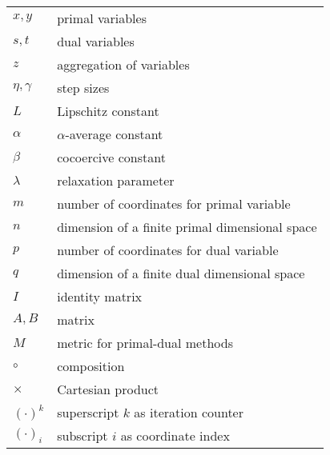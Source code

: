 \begin{table}[htbp]
\begin{tabular}{ll}
  \midrule
  $x, y$ & primal variables \\
  $s, t$ & dual variables \\
  $z$ & aggregation of variables \\ 
  \midrule
  $\eta, \gamma$ & step sizes\\
  $L$ & Lipschitz constant\\
  $\alpha$ & $\alpha$-average constant \\
  $\beta$ & cocoercive constant \\
  $\lambda$ & relaxation parameter \\
  $m$ & number of coordinates for primal variable\\
  $n$ & dimension of a finite primal dimensional space \\
  $p$ & number of coordinates for dual variable\\ 
  $q$ & dimension of a finite dual dimensional space \\
  \midrule
  $I$ & identity matrix \\
  $A, B$ & matrix \\
  $M$ & metric for primal-dual methods \\
  \midrule
  $\circ$ & composition\\
  $\times$ & Cartesian product \\
  $(\cdot)^k$ & superscript $k$ as iteration counter \\
  $(\cdot)_i$ & subscript $i$ as coordinate index\\
  \bottomrule
 \end{tabular}
\end{table}


